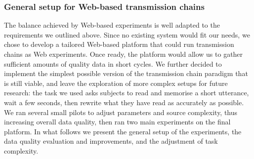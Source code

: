 \documentclass[a4paper,fleqn]{cas-dc}
\begin{document}

\subsubsection{General setup for Web-based transmission
chains}\label{general-setup-for-web-based-transmission-chains}

The balance achieved by Web-based experiments is well adapted to the
requirements we outlined above. Since no existing system would fit our needs, we
chose to develop a tailored Web-based platform that could run transmission
chains as Web experiments. Once ready, the platform would allow us to gather
sufficient amounts of quality data in short cycles. We further decided to
implement the simplest possible version of the transmission chain paradigm that
is still viable, and leave the exploration of more complex setups for future
research: the task we used asks subjects to read and memorise a short utterance,
wait a few seconds, then rewrite what they have read as accurately as possible.
We ran several small pilots to adjust parameters and source complexity, thus
increasing overall data quality, then ran two main experiments on the final
platform.
In what follows we present the general setup of the experiments, the data
quality evaluation and improvements, and the adjustment of task complexity.
\end{document}
